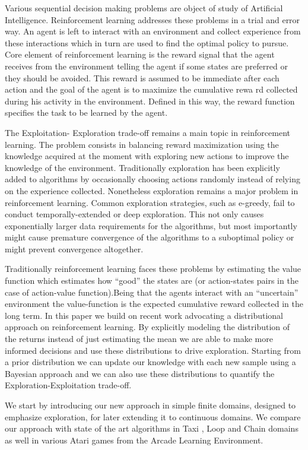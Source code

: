 \par
Various sequential decision making problems are object of study of Artificial Intelligence. Reinforcement learning addresses these problems in a trial and error way.  An agent is left to interact with an environment and collect experience from these interactions which in turn are used to find the optimal policy to pursue. Core element of reinforcement learning is the reward signal  that the agent receives from the environment telling the agent if some states are preferred or they should be avoided. This reward is assumed to be immediate after each action and the goal of the agent is to maximize the cumulative rewa rd collected during his activity in the environment. Defined in this way, the reward function specifies the task to be learned by the agent.\par
The Exploitation- Exploration trade-off remains a main topic in reinforcement learning. The problem consists in balancing reward maximization using the knowledge acquired at the moment with exploring new actions to improve the knowledge of the environment. Traditionally exploration has been explicitly added to algorithms by occasionally choosing actions randomly instead of relying on the experience collected. Nonetheless exploration remains a major problem in reinforcement learning. Common exploration strategies, such as e-greedy, fail to conduct temporally-extended or deep exploration. This not only causes exponentially larger data requirements for the algorithms, but most importantly might cause premature convergence of the algorithms to a suboptimal policy or might prevent convergence altogether.\par
Traditionally reinforcement learning faces these problems by estimating the value function  which estimates how “good” the states are (or action-states pairs in the case of action-value function).Being that the agents interact with an “uncertain” environment the value-function is the expected cumulative reward collected in the long term. In this paper we build on recent work advocating a distributional approach on reinforcement learning. By explicitly modeling the distribution of the returns instead of just estimating the mean we are able to make more informed decisions and use these distributions to drive exploration. Starting from a prior distribution we can update our knowledge with each new sample using a Bayesian approach and we can also use these distributions to quantify the Exploration-Exploitation trade-off.\par
We start by introducing our new approach in simple finite domains, designed to emphasize exploration, for later extending it to continuous domains.   We compare our approach with state of the art algorithms in Taxi , Loop and Chain domains as well in various Atari games from the Arcade Learning Environment.